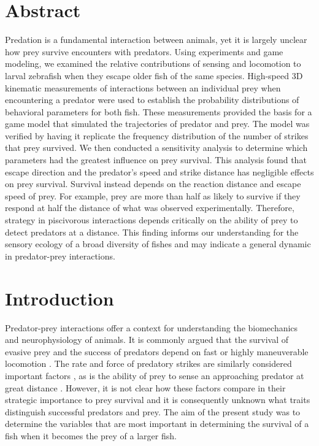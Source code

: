\documentclass[]{rsos}%
\begin{document}
\section*{Abstract}
Predation is a fundamental interaction between animals, yet it is largely unclear how prey survive encounters with predators.
Using experiments and game modeling, we examined the relative contributions of sensing and locomotion to larval zebrafish when they escape older fish of the same species.
High-speed 3D kinematic measurements of interactions between an individual prey when encountering a predator were used to establish the probability distributions of behavioral parameters for both fish.
These measurements provided the basis for a game model that simulated the trajectories of predator and prey. 
The model was verified by having it replicate the frequency distribution of the number of strikes that prey survived.
We then conducted a sensitivity analysis to determine which parameters had the greatest influence on prey survival.
This analysis found that escape direction and the predator's speed and strike distance has negligible effects on prey survival.
Survival instead depends on the reaction distance and escape speed of prey. 
For example, prey are more than half as likely to survive if they respond at half the distance of what was observed experimentally.
Therefore, strategy in piscivorous interactions depends critically on the ability of prey to detect predators at a distance.
This finding informs our understanding for the sensory ecology of a broad diversity of fishes and may indicate a general dynamic in predator-prey interactions.


\section{Introduction}

Predator-prey interactions offer a context for understanding the biomechanics and neurophysiology of animals.
It is commonly argued that the survival of evasive prey and the success of predators depend on fast or highly maneuverable locomotion \cite{Alexander:BbR35qCj, Wilson:2013fda, Walker:2005vn}.
The rate and force of predatory strikes are similarly considered important factors \cite{deVries:2012tc, Holzman:2009uu}, as is the ability of prey to sense an approaching predator at great distance \cite{Dill:1972wh, Gabbiani:1999wz}.
However, it is not clear how these factors compare in their strategic importance to prey survival and it is consequently unknown what traits distinguish successful predators and prey. 
The aim of the present study was to determine the variables that are most important in determining the survival of a fish when it becomes the prey of a larger fish.
\end{document}
